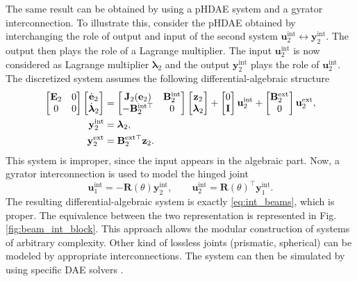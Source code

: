 \documentclass{svjour3}                     %
\begin{document}
The same result can be obtained by using a pHDAE system and a gyrator interconnection. To illustrate this, consider the pHDAE obtained by interchanging the role of output and input of the second system $\mathbf{u}_2^{\text{int}} \leftrightarrow \mathbf{y}_2^{\text{int}}$. The output then plays the role of a Lagrange multiplier. The input $\mathbf{u}_2^{\text{int}}$ is now considered as Lagrange multiplier ${\bm{\lambda}}_2$ and the output $\mathbf{y}_2^{\text{int}}$ plays the role of $\mathbf{u}_2^{\text{int}}$. The discretized system assumes the following differential-algebraic structure
\begin{equation}
\begin{aligned}
\begin{bmatrix}
\mathbf{E}_2 & 0 \\
0 & 0 \\
\end{bmatrix} \begin{bmatrix}
\dot{\mathbf{e}}_2 \\
\dot{\bm{\lambda}}_2 \\
\end{bmatrix}
&= \begin{bmatrix}
\mathbf{J}_2(\mathbf{e}_2) & \mathbf{B}_2^{\text{int}} \\
-\mathbf{B}_2^{\text{int} \top} & 0\\
\end{bmatrix} \begin{bmatrix}
\mathbf{z}_2 \\
{\bm{\lambda}}_2
\end{bmatrix} 
+ \begin{bmatrix}
0 \\
\mathbf{I}
\end{bmatrix} \mathbf{u}_2^{\text{int}} + \begin{bmatrix}
\mathbf{B}_2^{\text{ext}} \\
0 \\
\end{bmatrix} \mathbf{u}_2^{\text{ext}},  \vspace{2mm} \\
\mathbf{y}_2^{\text{int}} &= {\bm{\lambda}}_2, \\
\mathbf{y}_2^{\text{ext}} &= \mathbf{B}_2^{\text{ext} \top} \mathbf{z}_2.
\end{aligned}
\end{equation}
This system is improper, since the input appears in the algebraic part. Now, a gyrator interconnection is used to model the hinged joint
\begin{equation}
\label{eq:int_hinge_DAE}
\mathbf{u}_1^{\text{int}} = -\mathbf{R}(\theta) \mathbf{y}_2^{\text{int}}, \qquad
\mathbf{u}_2^{\text{int}} = \mathbf{R}(\theta)^\top \mathbf{y}_1^{\text{int}}.
\end{equation}
The resulting differential-algebraic system is exactly \eqref{eq:int_beams}, which is proper. The equivalence between the two representation is represented in Fig. \ref{fig:beam_int_block}. This approach allows the modular construction of systems of arbitrary complexity. Other kind of lossless joints (prismatic, spherical) can be modeled by appropriate interconnections. The system can then be simulated by using specific DAE solvers \cite{daePetzold}. 
\end{document}
